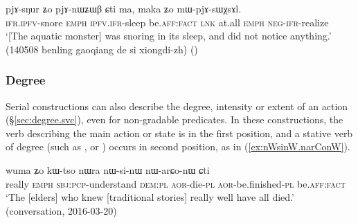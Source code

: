 \begin{exe}
\ex \label{ex:pjAsNur.Zo.pjAnWZWB}
\gll pjɤ-sŋur ʑo pjɤ-nɯʑɯβ ɕti ma, maka ʑo mɯ-pjɤ-sɯχsɤl. \\
\textsc{ifr}.\textsc{ipfv}-snore \textsc{emph} \textsc{ipfv}.\textsc{ifr}-sleep be.\textsc{aff}:\textsc{fact} \textsc{lnk} at.all \textsc{emph}  \textsc{neg}-\textsc{ifr}-realize \\
\glt `[The aquatic monster] was snoring in its sleep, and did not notice anything.' (140508 benling gaoqiang de si xiongdi-zh)
()
\end{exe}



\subsubsection{Degree} \label{sec:svc.degree}
Serial constructions can also describe the degree, intensity or extent of an action (§\ref{sec:degree.svc}), even for non-gradable predicates. In these constructions, the verb describing the main action or state is in the first position, and a stative verb of degree (such as ,  or ) occurs in second position, as in (\ref{ex:nWsinW.narConW}).

\begin{exe}
\ex \label{ex:nWsinW.narConW}
\gll   wuma ʑo kɯ-tso nɯra nɯ-si-nɯ nɯ-arɕo-nɯ ɕti \\
really \textsc{emph} \textsc{sbj}:\textsc{pcp}-understand \textsc{dem}:\textsc{pl} \textsc{aor}-die-\textsc{pl} \textsc{aor}-be.finished-\textsc{pl} be.\textsc{aff}:\textsc{fact} \\
\glt `The [elders] who knew [traditional stories] really well have all died.' (conversation, 2016-03-20)
\end{exe}


